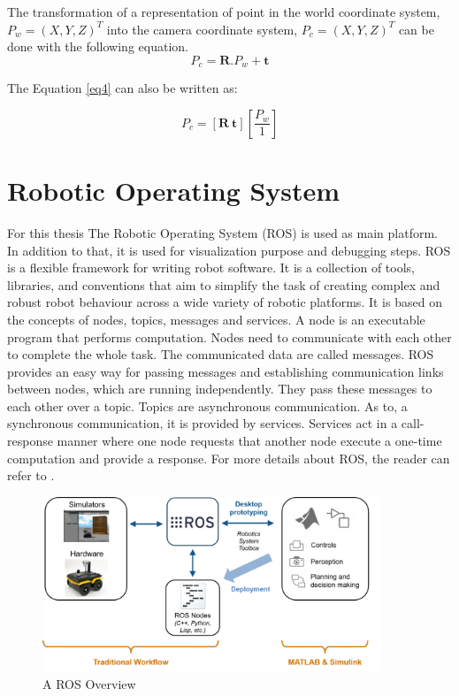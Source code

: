 The transformation of a representation of point in the world coordinate system, $ P_{w}=(X,Y,Z)^{T}$ into the camera coordinate system, $ P_{c}=(X,Y,Z)^{T}$ can be done with the following equation.
\begin{equation}\label{eq4} 
P_{c}=\textbf{R}.P_{w}+\textbf{t}
\end{equation}

 The Equation \ref{eq4} can also be written as:


\begin{equation}\label{eq5} 
    P_{c}=\left[\textbf{R} \ \textbf{t}\right]\left[\frac{P_{w}}{1}\right]   
\end{equation}

\section{Robotic Operating System}

For this thesis The Robotic Operating System (ROS) is used as main platform. In addition to that, it is used for visualization purpose and debugging steps. ROS is a flexible framework for writing robot software. It is  a collection of tools, libraries, and conventions that aim to simplify the task of creating complex and robust robot behaviour across a wide variety of robotic platforms. It is based on the concepts of nodes, topics, messages and services. A node is an executable program that performs computation. Nodes need to communicate with each other to complete the whole task. The communicated data are called messages. ROS provides an easy way for passing messages and establishing communication links between nodes, which are running independently. They pass these messages to each other over a topic. Topics are asynchronous communication. As to, a synchronous communication, it is provided by services. Services act in a call-response manner where one node requests that another node execute a one-time computation and provide a response. For more details about ROS, the reader can refer to \cite{ros}.

\begin{figure}[!h]
\begin{center}
\includegraphics[width=4in]{figures02/ros_workflows.png}
\caption{A ROS Overview}%
\end{center}
\end{figure}


